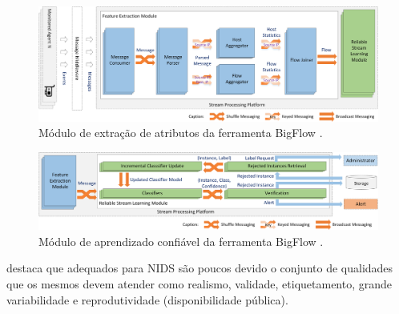 \begin{figure}[!h]
\centering
\includegraphics[width=\textwidth]{figuras/bigflow-fig2-feature_extraction_module.png}
\caption{Módulo de extração de atributos da ferramenta BigFlow \cite{Viegas2019}.}
\label{fig:bigflow-pcap}
\end{figure}

\begin{figure}[!ht]
\centering
\includegraphics[width=\textwidth]{figuras/bigflow-fig4-reliable_learning_module.png}
\caption{Módulo de aprendizado confiável da ferramenta BigFlow \cite{Viegas2019}.}
\label{fig:bigflow-ml}
\end{figure}



 destaca que \datasets adequados para NIDS são
poucos devido o conjunto de qualidades que os mesmos devem atender como
realismo, validade, etiquetamento, grande variabilidade e reprodutividade
(disponibilidade pública).


